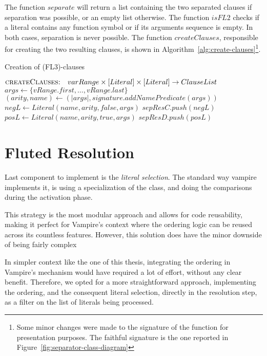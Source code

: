 The function \(separate\) will return a list containing the two separated clauses if separation was possible, or an empty list otherwise.
The function \(isFL2\) checks if a literal contains any function symbol or if its arguments sequence is empty. In both cases, separation is never possible.
The function \(createClauses\), responsible for creating the two resulting clauses, is shown in Algorithm~\ref{alg:create-clauses}\footnote{
  Some minor changes were made to the signature of the function for presentation purposes. The faithful signature is the one reported in Figure~\ref{fig:separator-class-diagram}
}.

\begin{algorithm}[H]
  \caption{Creation of (FL3)-clauses}\label{alg:create-clauses}
  \begin{algorithmic}[1]
    \Statex{}  \(\textsc{createClauses:}\quad varRange \times [Literal] \times [Literal] \to ClauseList\)
      \State{} \(args \gets \{vRange.first,\ldots,vRange.last\}\)
      \State{} \((arity,name) \gets(|args|,signature.addNamePredicate(args))\)
      \State{} \(negL \gets Literal(name,arity,false,args)\)
      \State{} \(sepResC.push(negL)\)
      \State{} \(posL \gets Literal(name,arity,true,args)\)
      \State{} \(sepResD.push(posL)\)
      \State{} 
    \EndFunction{}
  \end{algorithmic}
\end{algorithm}

\section{Fluted Resolution}\label{sec:fluted-resolution-impl}

Last component to implement is the \emph{literal selection}.
The standard way vampire implements it, is using a specialization of the  class, and doing the comparisons during the activation phase.

This strategy is the most modular approach and allows for code reusability, making it perfect for Vampire's context where the ordering logic can be reused across its countless features.
However, this solution does have the minor downside of being fairly complex

In simpler context like the one of this thesis, integrating the ordering in Vampire's mechanism would have required a lot of effort, without any clear benefit.
Therefore, we opted for a more straightforward approach, implementing the ordering, and the consequent literal selection, directly in the resolution step, as a filter on the list of literals being processed.

